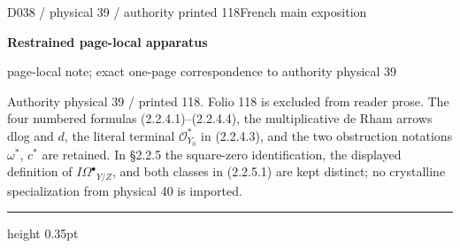 \documentclass[9pt]{article}
\newcommand{\CanonText}[1]{\par{\fontsize{8.0}{9.35}\selectfont\RaggedRight #1\par}\vspace{2.2pt}}
\newcommand{\LayerTitle}{Restrained page-local apparatus}
\begin{document}
\noindent\begin{minipage}[t][\dimexpr\textheight-5pt\relax][t]{\textwidth}
{\sffamily\fontsize{7.3}{8.2}\selectfont\color{Quiet} D038 / physical 39 / authority printed 118\hfill French main exposition}
\par{}\vspace{4.5pt}
{\sffamily\fontsize{10.4}{11.6}\selectfont\bfseries\color{Accent} \LayerTitle}
\par{\sffamily\fontsize{6.7}{7.7}\selectfont\color{Quiet} page-local note; exact one-page correspondence to authority physical 39}
\vspace{5pt}
\CanonText{Authority physical 39 / printed 118. Folio 118 is excluded from reader prose. The four numbered formulas (2.2.4.1)–(2.2.4.4), the multiplicative de Rham arrows dlog and \(d\), the literal terminal \(\mathcal{O}^{*}_{Y_{0}}\) in (2.2.4.3), and the two obstruction notations \(\omega{}^{*}\), \(c^{*}\) are retained. In §2.2.5 the square-zero identification, the displayed definition of \(I\Omega{}^\bullet{}_{Y/Z}\), and both classes in (2.2.5.1) are kept distinct; no crystalline specialization from physical 40 is imported.}
\vfill
{\color{Accent}\hrule height 0.35pt}\vspace{3pt}
\end{minipage}
\newpage
\end{document}
